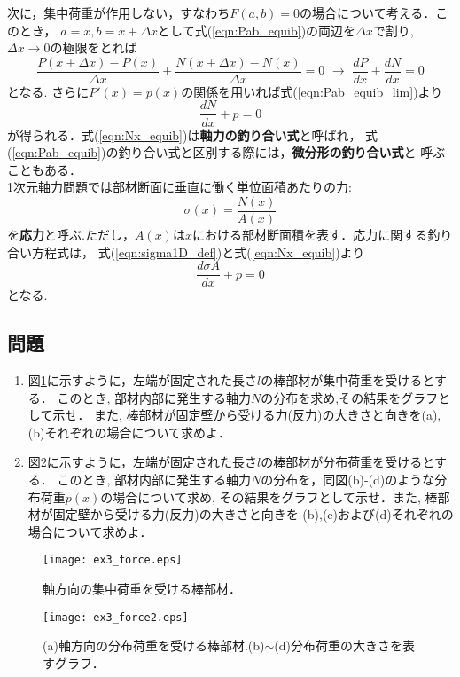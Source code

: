 \documentclass[10pt,a4j]{jbook}
\begin{document}
次に，集中荷重が作用しない，すなわち$F(a,b)=0$の場合について考える．このとき，
$a=x, b=x+\Delta x$として式(\ref{eqn:Pab_equib})の両辺を$\Delta x$で割り, 
$\Delta x\rightarrow 0$の極限をとれば
\begin{equation}
	\frac{P(x+\Delta x)-P(x)}{\Delta x}+\frac{N(x+\Delta x)-N(x)}{\Delta x}=0 \,\,
	\rightarrow
	\, \,
	\frac{dP}{dx}+\frac{dN}{dx}=0
	\label{eqn:Pab_equib_lim}
\end{equation}
となる. さらに$P'(x)=p(x)$の関係を用いれば式(\ref{eqn:Pab_equib_lim})より
\begin{equation}
	\frac{dN}{dx}+p=0
	\label{eqn:Nx_equib}
\end{equation}
が得られる．式(\ref{eqn:Nx_equib})は{\rm \bf 軸力の釣り合い式}と呼ばれ，
式(\ref{eqn:Pab_equib})の釣り合い式と区別する際には，{\rm \bf 微分形の釣り合い式}と
呼ぶこともある．\\

1次元軸力問題では部材断面に垂直に働く単位面積あたりの力:
\begin{equation}
	\sigma(x) = \frac{N(x)}{A(x)}
	\label{eqn:sigma1D_def}
\end{equation}
を{\rm \bf 応力}と呼ぶ.ただし，$A(x)$は$x$における部材断面積を表す．応力に関する釣り合い方程式は，
式(\ref{eqn:sigma1D_def})と式(\ref{eqn:Nx_equib})より
\begin{equation}
	\frac{d\sigma A}{dx}+p=0
	\label{eqn:sigx_equib}
\end{equation}
となる.
\subsection{問題}
\begin{enumerate}
\item
図\ref{fig:fig3}に示すように，左端が固定された長さ$l$の棒部材が集中荷重を受けるとする．
このとき, 部材内部に発生する軸力$N$の分布を求め,その結果をグラフとして示せ．
また, 棒部材が固定壁から受ける力(反力)の大きさと向きを(a),(b)それぞれの場合について求めよ．
\item
図\ref{fig:fig3_2}に示すように，左端が固定された長さ$l$の棒部材が分布荷重を受けるとする．
このとき, 部材内部に発生する軸力$N$の分布を，同図(b)-(d)のような分布荷重$p(x)$の場合について求め,
その結果をグラフとして示せ．また, 棒部材が固定壁から受ける力(反力)の大きさと向きを
(b),(c)および(d)それぞれの場合について求めよ．
\end{enumerate}
\begin{figure}[h]
	\begin{center}
	\texttt{[image: ex3\_force.eps]} 
	\end{center}
	\caption{軸方向の集中荷重を受ける棒部材．} 
	\label{fig:fig3}
\end{figure}
\begin{figure}[h]
	\begin{center}
	\texttt{[image: ex3\_force2.eps]} 
	\end{center}
	\caption{(a)軸方向の分布荷重を受ける棒部材.(b)$\sim$(d)分布荷重の大きさを表すグラフ．} 
	\label{fig:fig3_2}
\end{figure}
\end{document}
